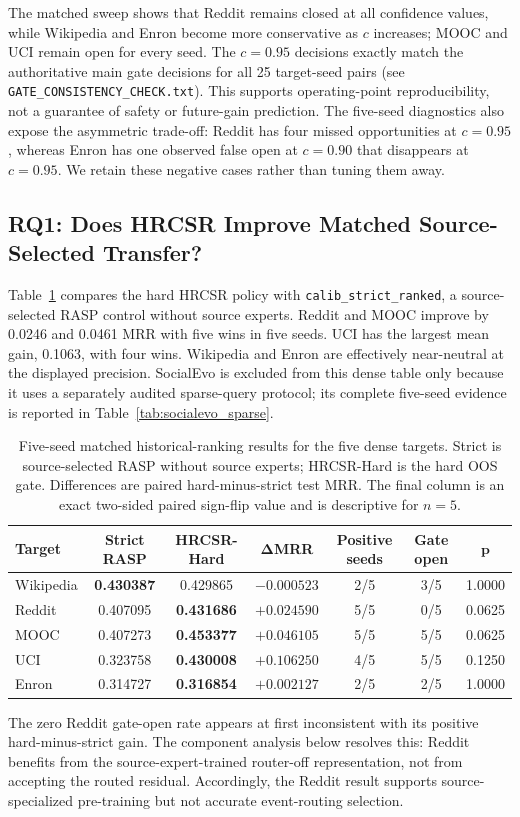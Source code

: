 \documentclass[journal]{IEEEtran}
\begin{document}
The matched sweep shows that Reddit remains closed at all confidence values, while Wikipedia and Enron become more conservative as $c$ increases; MOOC and UCI remain open for every seed. The $c=0.95$ decisions exactly match the authoritative main gate decisions for all 25 target-seed pairs (see \texttt{GATE\_CONSISTENCY\_CHECK.txt}). This supports operating-point reproducibility, not a guarantee of safety or future-gain prediction. The five-seed diagnostics also expose the asymmetric trade-off: Reddit has four missed opportunities at $c=0.95$, whereas Enron has one observed false open at $c=0.90$ that disappears at $c=0.95$. We retain these negative cases rather than tuning them away.

\subsection{RQ1: Does HRCSR Improve Matched Source-Selected Transfer?}
Table~\ref{tab:hrcsr_main} compares the hard HRCSR policy with \texttt{calib\_strict\_ranked}, a source-selected RASP control without source experts. Reddit and MOOC improve by 0.0246 and 0.0461 MRR with five wins in five seeds. UCI has the largest mean gain, 0.1063, with four wins. Wikipedia and Enron are effectively near-neutral at the displayed precision. SocialEvo is excluded from this dense table only because it uses a separately audited sparse-query protocol; its complete five-seed evidence is reported in Table~\ref{tab:socialevo_sparse}.

\begin{table}[t]
\centering
\caption{Five-seed matched historical-ranking results for the five dense targets. Strict is source-selected RASP without source experts; HRCSR-Hard is the hard OOS gate. Differences are paired hard-minus-strict test MRR. The final column is an exact two-sided paired sign-flip value and is descriptive for $n=5$.}
\label{tab:hrcsr_main}
\small
\begin{tabular}{lcccccc}
\toprule
\textbf{Target} & \textbf{Strict RASP} & \textbf{HRCSR-Hard} & $\boldsymbol{\Delta}$\textbf{MRR} & \textbf{Positive seeds} & \textbf{Gate open} & $\boldsymbol{p}$ \\
\midrule
Wikipedia & \textbf{0.430387} & 0.429865 & $-0.000523$ & 2/5 & 3/5 & 1.0000 \\
Reddit    & 0.407095 & \textbf{0.431686} & $+0.024590$ & 5/5 & 0/5 & 0.0625 \\
MOOC      & 0.407273 & \textbf{0.453377} & $+0.046105$ & 5/5 & 5/5 & 0.0625 \\
UCI       & 0.323758 & \textbf{0.430008} & $+0.106250$ & 4/5 & 5/5 & 0.1250 \\
Enron     & 0.314727 & \textbf{0.316854} & $+0.002127$ & 2/5 & 2/5 & 1.0000 \\
\bottomrule
\end{tabular}
\end{table}
The zero Reddit gate-open rate appears at first inconsistent with its positive hard-minus-strict gain. The component analysis below resolves this: Reddit benefits from the source-expert-trained router-off representation, not from accepting the routed residual. Accordingly, the Reddit result supports source-specialized pre-training but not accurate event-routing selection.
\end{document}

